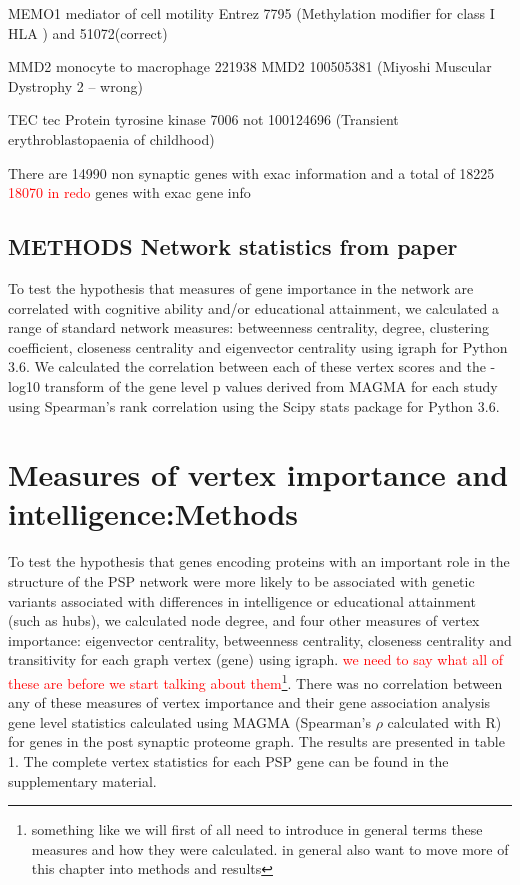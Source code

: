 MEMO1 mediator of cell motility Entrez 7795 (Methylation modifier for class I HLA
) and 51072(correct)

MMD2 monocyte to macrophage 221938 MMD2 100505381 (Miyoshi Muscular Dystrophy 2 – wrong)

TEC tec Protein tyrosine kinase 7006 not 100124696 (Transient erythroblastopaenia of childhood)

There are 14990 non synaptic genes with exac information and a total of 18225 \textcolor{red}{18070 in redo} genes with exac gene info



\subsection{METHODS Network statistics from paper}
\label{sec: network statistics from paper}

To test the hypothesis that measures of gene importance in the network are correlated with cognitive ability and/or educational attainment, we calculated a range of standard network measures: betweenness centrality, degree, clustering coefficient, closeness centrality and eigenvector centrality using igraph for Python 3.6. \cite{csardi2006igraph}  We calculated the correlation between each of these vertex scores and the -log10 transform of the gene level p values derived from MAGMA for each study using Spearman’s rank correlation using the Scipy stats package for Python 3.6. \section{Measures of vertex importance and intelligence:Methods}

\label{sec:Measurs of vertex importance from paper}
To test the hypothesis that genes encoding proteins with an important role in the structure of the PSP network were more likely to be associated with genetic variants associated with differences in intelligence or educational attainment (such as hubs), we calculated node degree, and four other measures of vertex importance: eigenvector centrality, betweenness centrality, closeness centrality and transitivity for each graph vertex (gene) using igraph. \cite{csardi2006igraph} \textcolor{red}{we need to say what all of these are before we start talking about them}\footnote{something like we will first of all need to introduce in general terms these measures and how they were calculated. in general also want to move more of this chapter into methods and results}. There was no correlation between any of these measures of vertex importance and their gene association analysis gene level statistics calculated using MAGMA (Spearman’s $\rho$ calculated with R) for genes in the post synaptic proteome graph. The results are presented in table 1. The complete vertex statistics for each PSP gene can be found in the supplementary material. 

